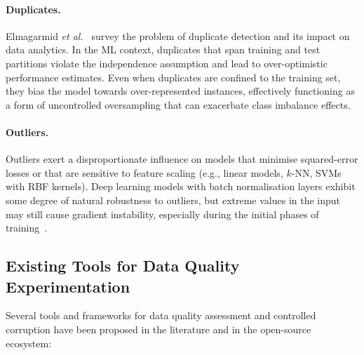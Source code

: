 \paragraph{Duplicates.}
Elmagarmid \emph{et al.}~\cite{elmagarmid2007duplicate} survey the problem of
duplicate detection and its impact on data analytics.  In the ML context,
duplicates that span training and test partitions violate the independence
assumption and lead to over-optimistic performance estimates.  Even when
duplicates are confined to the training set, they bias the model towards
over-represented instances, effectively functioning as a form of uncontrolled
oversampling that can exacerbate class imbalance effects.

\paragraph{Outliers.}
Outliers exert a disproportionate influence on models that minimise
squared-error losses or that are sensitive to feature scaling (e.g., linear
models, $k$-NN, SVMs with RBF kernels).  Deep learning models with batch
normalisation layers exhibit some degree of natural robustness to outliers, but
extreme values in the input may still cause gradient instability, especially
during the initial phases of training~\cite{goodfellow2016deep}.

\subsection{Existing Tools for Data Quality Experimentation}
\label{sec:existing-tools}

Several tools and frameworks for data quality assessment and controlled
corruption have been proposed in the literature and in the open-source
ecosystem:


